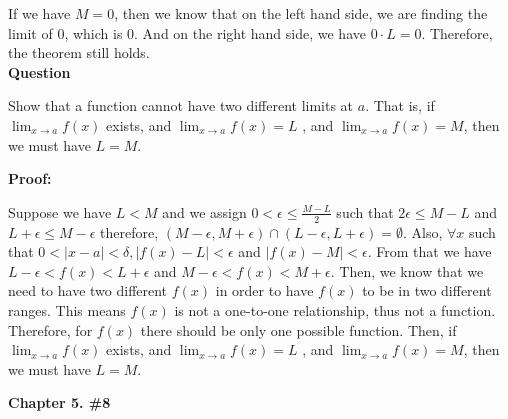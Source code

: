 \documentclass[a4paper,12pt]{report}
\begin{document}
\noindent
If we have $M=0$, then we know that on the left hand side, we are finding the limit of 0, which is 0. And on the right hand side, we have $0\cdot{L}=0$. Therefore, the theorem still holds.\\

\noindent
\textbf{Question}

\noindent
Show that a function cannot
have two different limits at $a$. That is, 
if $\displaystyle{\lim_{x\to a}}f(x)$ exists, and 
$\displaystyle{\lim_{x\to a}}f(x)=L$ , and
$\displaystyle{\lim_{x\to a}}f(x)=M$, then we
must have $L=M$.

\noindent
\textbf{Proof: }

\noindent
Suppose we have $ L < M$ and we assign $0<\epsilon\leq \frac{M-L}{2}$ such that $2\epsilon\leq M-L$ and $L+\epsilon\leq M-\epsilon$ therefore, $(M-\epsilon,M+\epsilon)\cap (L-\epsilon,L+\epsilon)=\emptyset$. Also, $\forall x $ such that $0<|x-a|<\delta, |f(x)-L|< \epsilon$ and $|f(x)-M|< \epsilon$. From that we have $L-\epsilon<f(x)<L+\epsilon$ and $M-\epsilon<f(x)<M+\epsilon$. Then, we know that we need to have two different $f(x)$ in order to have $f(x)$ to be in two different ranges. This means $f(x)$ is not a one-to-one relationship, thus not a function. Therefore, for $f(x)$ there should be only one possible function. Then, if  $\displaystyle{\lim_{x\to a}}f(x)$ exists, and 
$\displaystyle{\lim_{x\to a}}f(x)=L$ , and
$\displaystyle{\lim_{x\to a}}f(x)=M$, then we
must have $L=M$.

\pagebreak
\noindent
\textbf{Chapter 5. \#8}

\noindent
\end{document}
